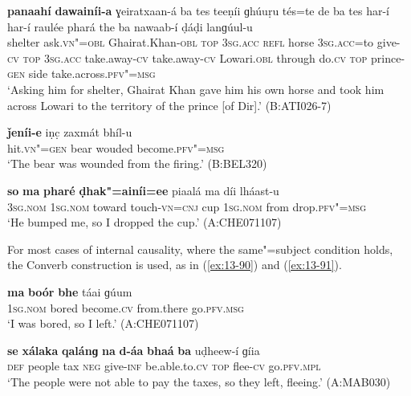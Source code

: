 \begin{exe}
\ex
\label{ex:13-87}
\gll \textbf{panaahí} \textbf{dawainíi-a} ɣeiratxaan-á ba tes teeṇíi ɡhúuṛu tés=te de ba tes har-í har-í raulée phará the ba nawaab-í ḍáḍi lanɡúul-u \\
shelter ask.\textsc{vn"=obl} Ghairat.Khan-\textsc{obl} \textsc{top} \textsc{3sg.acc} \textsc{refl}  horse \textsc{3sg.acc}=to give-\textsc{cv} \textsc{top} \textsc{3sg.acc} take.away-\textsc{cv} take.away-\textsc{cv} Lowari.\textsc{obl} through do.\textsc{cv} \textsc{top} prince-\textsc{gen} side take.across.\textsc{pfv"=msg} \\
\glt `Asking him for shelter, Ghairat Khan gave him his own horse and took him across Lowari to the territory of the prince [of Dir].' (B:ATI026-7)

\ex
\label{ex:13-88}
\gll \textbf{ǰeníi-e} iṇc̣ zaxmát bhíl-u \\
hit.\textsc{vn"=gen} bear wouded become.\textsc{pfv"=msg} \\
\glt `The bear was wounded from the firing.' (B:BEL320)

\ex
\label{ex:13-89}
\gll \textbf{so} \textbf{ma} \textbf{pharé} \textbf{ḍhak"=ainíi=ee} piaalá ma díi lháast-u \\
\textsc{3sg.nom} \textsc{1sg.nom} toward touch-\textsc{vn=cnj} cup \textsc{1sg.nom} from drop.\textsc{pfv"=msg}  \\
\glt `He bumped me, so I dropped the cup.' (A:CHE071107) 
\end{exe}

For most cases of internal causality, where the same"=subject condition holds, the Converb construction is used, as in (\ref{ex:13-90}) and (\ref{ex:13-91}).

\begin{exe}
\ex
\label{ex:13-90}
\gll \textbf{ma} \textbf{boór} \textbf{bhe} táai ɡúum  \\
\textsc{1sg.nom} bored become.\textsc{cv} from.there go.\textsc{pfv.msg}  \\
\glt `I was bored, so I left.' (A:CHE071107)

\ex
\label{ex:13-91}
\gll \textbf{se} \textbf{xálaka} \textbf{qalánɡ} \textbf{na} \textbf{d-áa} \textbf{bhaá} \textbf{ba} uḍheew-í ɡíia \\
 \textsc{def} people tax \textsc{neg} give-\textsc{inf} be.able.to.\textsc{cv} \textsc{top} flee-\textsc{cv}  go.\textsc{pfv.mpl}   \\
\glt `The people were not able to pay the taxes, so they left, fleeing.' (A:MAB030) 
\end{exe}

